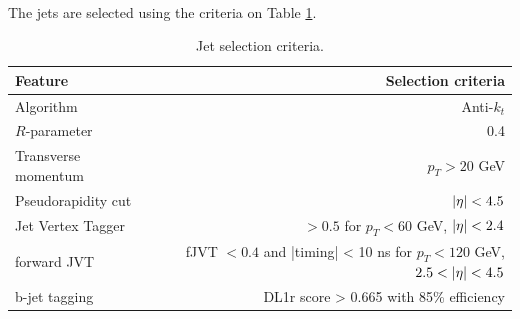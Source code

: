 \documentclass[14pt, a4paper]{book}
\begin{document}
\\The jets are selected using the criteria on Table \ref{tab:jet_selec}.
\begin{table}[!h]
    \centering\caption[Jet selection criteria]{Jet selection criteria.}
    \begin{tabular}{l|r}\midrule\midrule
        Feature                                                                 & Selection criteria        \\\midrule
        Algorithm                                                               & Anti-$k_t$     \\
        $R$-parameter                                                           & 0.4     \\\midrule
        Transverse momentum                                                     & $p_T > 20$ GeV     \\
        Pseudorapidity cut                                                      & $\abs{\eta}<4.5$ \\
        Jet Vertex Tagger                                                       & $>0.5$ for $p_T<60$ GeV, $\abs{\eta}<2.4$ \\
        forward JVT                                                             & fJVT $<0.4$ and |timing| < 10 ns for $p_T<120$ GeV, $2.5<\abs{\eta}<4.5$ \\\midrule
        b-jet tagging                                                           & DL1r score > 0.665 with 85\% efficiency \\\midrule\midrule
    \end{tabular}
    \label{tab:jet_selec}
\end{table}
\end{document}
